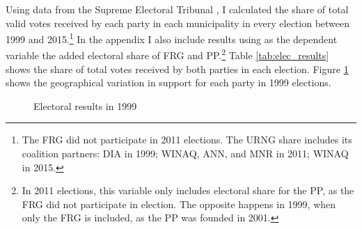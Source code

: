 \documentclass[12pt, notitlepage]{article}
\begin{document}
Using data from the Supreme Electoral Tribunal \citep{TSE:2019aa}, I calculated the share of total valid votes received by each party in each municipality in every election between 1999 and 2015.\footnote{The FRG did not participate in 2011 elections. The URNG share includes its coalition partners: DIA in 1999; WINAQ, ANN, and MNR in 2011; WINAQ in 2015.}
In the appendix I also include results using as the dependent variable the added electoral share of FRG and PP.\footnote{In 2011 elections, this variable only includes electoral share for the PP, as the FRG did not participate in election. The opposite happens in 1999, when only the FRG is included, as the PP was founded in 2001.}
Table \ref{tab:elec_results} shows the share of total votes received by both parties in each election.
Figure \ref{fig:map_elec1999} shows the geographical variation in support for each party in 1999 elections.

\begin{figure}[!ht]
    \centering

    \begin{minipage}{1\textwidth}
      \centering
      \hspace{25pt}
    \end{minipage}

    \caption{Electoral results in 1999}\label{fig:map_elec1999}

\end{figure}
\end{document}
